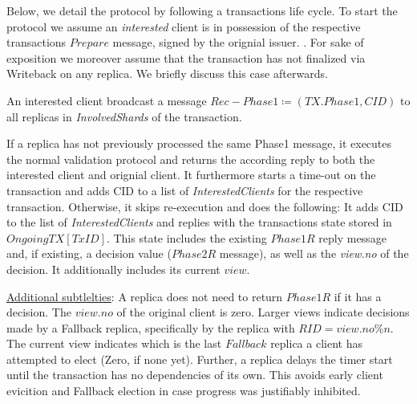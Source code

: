 Below, we detail the protocol by following a transactions life cycle. To start the protocol we assume an \textit{interested} client is in possession of the respective transactions $Prepare$ message, signed by the orignial issuer. . For sake of exposition we moreover assume that the transaction has not finalized via Writeback on any replica. We briefly discuss this case afterwards.




An interested client broadcast a message $Rec-Phase1 \coloneqq (TX.Phase1, CID)$ to all replicas in \textit{InvolvedShards} of the transaction. 

If a replica has not previously processed the same Phase1 message, it executes the normal validation protocol and returns the according reply to both the interested client and orignial client. It furthermore starts a time-out on the transaction and adds CID to a list of \textit{InterestedClients} for the respective transaction.
Otherwise, it skips re-execution and does the following: It adds CID to the list of \textit{InterestedClients} and replies with the transactions state stored in $OngoingTX[TxID]$. This state includes the existing $Phase1R$ reply message and, if existing, a decision value ($Phase2R$ message), as well as the \textit{view.no} of the decision. It additionally includes its current $view$.

\underline{Additional subtlelties}: A replica does not need to return $Phase1R$ if it has a decision. The $view.no$ of the original client is zero. Larger views indicate decisions made by a Fallback replica, specifically by the replica with $RID = view.no \% n$. The current view indicates which is the last $Fallback$ replica a client has attempted to elect (Zero, if none yet). Further, a replica delays the timer start until the transaction has no dependencies of its own. This avoids early client evicition and Fallback election in case progress was justifiably inhibited. 

